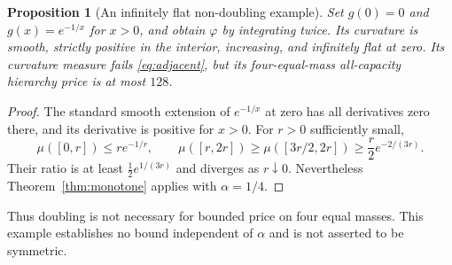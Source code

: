 \documentclass[11pt]{article}
\newtheorem{proposition}[theorem]{Proposition}
\theoremstyle{definition}\newtheorem{definition}[theorem]{Definition}
\theoremstyle{remark}\newtheorem{remark}[theorem]{Remark}
\newcommand{\ph}{\varphi}
\begin{document}
\begin{proposition}[An infinitely flat non-doubling example]
\label{prop:nondoubling}
Set $g(0)=0$ and $g(x)=e^{-1/x}$ for $x>0$, and obtain $\ph$ by integrating twice. Its curvature is smooth, strictly positive in the interior, increasing, and infinitely flat at zero. Its curvature measure fails \eqref{eq:adjacent}, but its four-equal-mass all-capacity hierarchy price is at most $128$.
\end{proposition}
\begin{proof}
The standard smooth extension of $e^{-1/x}$ at zero has all derivatives zero there, and its derivative is positive for $x>0$. For $r>0$ sufficiently small,
\[
\mu([0,r])\le r e^{-1/r},\qquad
\mu([r,2r])\ge\mu([3r/2,2r])\ge\frac r2e^{-2/(3r)}.
\]
Their ratio is at least $\tfrac12e^{1/(3r)}$ and diverges as $r\downarrow0$. Nevertheless Theorem~\ref{thm:monotone} applies with $\alpha=1/4$.
\end{proof}
Thus doubling is not necessary for bounded price on four equal masses. This example establishes no bound independent of $\alpha$ and is not asserted to be symmetric.
\end{document}
